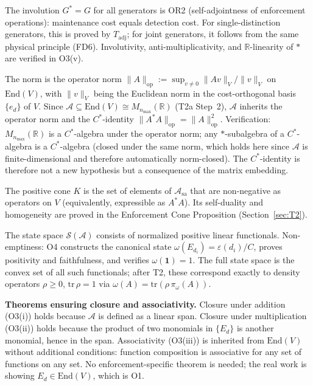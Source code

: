 \documentclass[11pt]{article}
\theoremstyle{remark}
\begin{document}
\begin{tcolorbox}[defbox, title={Definition: The Enforcement Algebra $(\mathcal{A},\,\cdot\,,\,^*,\,\mathcal{S})$}]
The involution $G^* = G$ for all generators is OR2 (self-adjointness of enforcement operations): maintenance cost equals detection cost.  For single-distinction generators, this is proved by $T_{\mathrm{adj}}$; for joint generators, it follows from the same physical principle (FD6).  Involutivity, anti-multiplicativity, and $\mathbb{R}$-linearity of $*$ are verified in O3(v).

The norm is the operator norm $\|A\|_{\mathrm{op}} := \sup_{v \ne 0} \|Av\|_V/\|v\|_V$ on $\mathrm{End}(V)$, with $\|v\|_V$ being the Euclidean norm in the cost-orthogonal basis $\{e_d\}$ of $V$.  Since $\mathcal{A} \subseteq \mathrm{End}(V) \cong M_{n_{\max}}(\mathbb{R})$ (T2a Step~2), $\mathcal{A}$ inherits the operator norm and the $C^*$-identity $\|A^*A\|_{\mathrm{op}} = \|A\|_{\mathrm{op}}^2$.  Verification: $M_{n_{\max}}(\mathbb{R})$ is a $C^*$-algebra under the operator norm; any $*$-subalgebra of a $C^*$-algebra is a $C^*$-algebra (closed under the same norm, which holds here since $\mathcal{A}$ is finite-dimensional and therefore automatically norm-closed).  The $C^*$-identity is therefore not a new hypothesis but a consequence of the matrix embedding.

The positive cone $K$ is the set of elements of $\mathcal{A}_{\mathrm{sa}}$ that are non-negative as operators on $V$ (equivalently, expressible as $A^*A$).  Its self-duality and homogeneity are proved in the Enforcement Cone Proposition (Section~\ref{sec:T2}).

The state space $\mathcal{S}(\mathcal{A})$ consists of normalized positive linear functionals.  Non-emptiness: O4 constructs the canonical state $\omega(E_{d_i}) = \varepsilon(d_i)/C$, proves positivity and faithfulness, and verifies $\omega(\mathbf{1}) = 1$.  The full state space is the convex set of all such functionals; after T2, these correspond exactly to density operators $\rho \ge 0$, $\mathrm{tr}\,\rho = 1$ via $\omega(A) = \mathrm{tr}(\rho\,\pi_\omega(A))$.

\medskip\noindent\textbf{Theorems ensuring closure and associativity.}  Closure under addition (O3(i)) holds because $\mathcal{A}$ is defined as a linear span.  Closure under multiplication (O3(ii)) holds because the product of two monomials in $\{E_d\}$ is another monomial, hence in the span.  Associativity (O3(iii)) is inherited from $\mathrm{End}(V)$ without additional conditions: function composition is associative for any set of functions on any set.  No enforcement-specific theorem is needed; the real work is showing $E_d \in \mathrm{End}(V)$, which is O1.
\end{tcolorbox}
\end{document}
